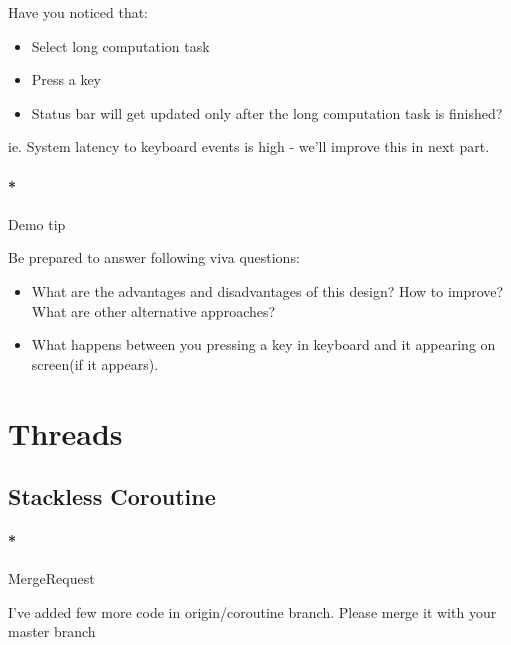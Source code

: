 \documentclass[]{article}
\newenvironment{Shaded}{}{}
\newcommand{\ExtensionTok}[1]{{#1}}
\newcommand{\NormalTok}[1]{{#1}}
\providecommand{\tightlist}{%
  \setlength{\itemsep}{0pt}\setlength{\parskip}{0pt}}
\let\oldparagraph\paragraph
\renewcommand{\paragraph}[1]{\oldparagraph{#1}\mbox{}}
\begin{document}
Have you noticed that:

\begin{itemize}
\tightlist
\item
  Select long computation task
\item
  Press a key
\item
  Status bar will get updated only after the long computation task is
  finished?
\end{itemize}

ie. System latency to keyboard events is high - we'll improve this in
next part.

\paragraph*{Demo tip}\label{demo-tip-3}

Be prepared to answer following viva questions:

\begin{itemize}
\tightlist
\item
  What are the advantages and disadvantages of this design? How to
  improve? What are other alternative approaches?
\item
  What happens between you pressing a key in keyboard and it appearing
  on screen(if it appears).
\end{itemize}

\section{Threads}\label{threads}

\subsection{Stackless Coroutine}\label{stackless-coroutine}

\paragraph*{MergeRequest}\label{mergerequest-4}

I've added few more code in origin/coroutine branch. Please merge it
with your master branch

\begin{Shaded}
\end{Shaded}
\end{document}

